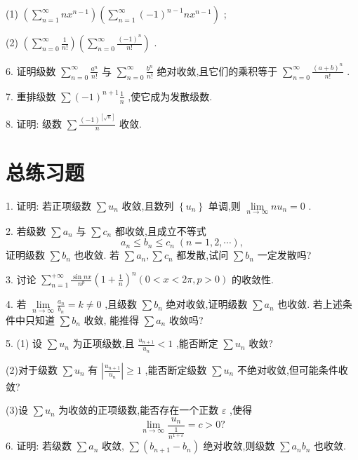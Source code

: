 (1) \(\left( {\mathop{\sum }\limits_{{n = 1}}^{\infty }n{x}^{n - 1}}\right) \left( {\mathop{\sum }\limits_{{n = 1}}^{\infty }{\left( -1\right) }^{n - 1}n{x}^{n - 1}}\right)\) ;

(2) \(\left( {\mathop{\sum }\limits_{{n = 0}}^{\infty }\frac{1}{n!}}\right) \left( {\mathop{\sum }\limits_{{n = 0}}^{\infty }\frac{{\left( -1\right) }^{n}}{n!}}\right)\) .

6. 证明级数 \(\mathop{\sum }\limits_{{n = 0}}^{\infty }\frac{{a}^{n}}{n!}\) 与 \(\mathop{\sum }\limits_{{n = 0}}^{\infty }\frac{{b}^{n}}{n!}\) 绝对收敛,且它们的乘积等于 \(\mathop{\sum }\limits_{{n = 0}}^{\infty }\frac{{\left( a + b\right) }^{n}}{n!}\) .

7. 重排级数 \(\sum {\left( -1\right) }^{n + 1}\frac{1}{n}\) ,使它成为发散级数.

8. 证明: 级数 \(\sum \frac{{\left( -1\right) }^{\left\lbrack  \sqrt{n}\right\rbrack  }}{n}\) 收敛.

\section{总练习题}

1. 证明: 若正项级数 \(\sum {u}_{n}\) 收敛,且数列 \(\left\{  {u}_{n}\right\}\) 单调,则 \(\mathop{\lim }\limits_{{n \rightarrow  \infty }}n{u}_{n} = 0\) .

2. 若级数 \(\sum {a}_{n}\) 与 \(\sum {c}_{n}\) 都收敛,且成立不等式
\[
{a}_{n} \leq  {b}_{n} \leq  {c}_{n}\;\left( {n = 1,2,\cdots }\right) ,
\]
证明级数 \(\sum {b}_{n}\) 也收敛. 若 \(\sum {a}_{n},\sum {c}_{n}\) 都发散,试问 \(\sum {b}_{n}\) 一定发散吗?

3. 讨论 \(\mathop{\sum }\limits_{{n = 1}}^{{+\infty }}\frac{\sin {nx}}{{n}^{p}}{\left( 1 + \frac{1}{n}\right) }^{n}\left( {0 < x < {2\pi },p > 0}\right)\) 的收敛性.

4. 若 \(\mathop{\lim }\limits_{{n \rightarrow  \infty }}\frac{{a}_{n}}{{b}_{n}} = k \neq  0\) ,且级数 \(\sum {b}_{n}\) 绝对收敛,证明级数 \(\sum {a}_{n}\) 也收敛. 若上述条件中只知道 \(\sum {b}_{n}\) 收敛, 能推得 \(\sum {a}_{n}\) 收敛吗?

5. (1) 设 \(\sum {u}_{n}\) 为正项级数,且 \(\frac{{u}_{n + 1}}{{u}_{n}} < 1\) ,能否断定 \(\sum {u}_{n}\) 收敛?

(2)对于级数 \(\sum {u}_{n}\) 有 \(\left| \frac{{u}_{n + 1}}{{u}_{n}}\right|  \geq  1\) ,能否断定级数 \(\sum {u}_{n}\) 不绝对收敛,但可能条件收敛?

(3)设 \(\sum {u}_{n}\) 为收敛的正项级数,能否存在一个正数 \(\varepsilon\) ,使得
\[
\mathop{\lim }\limits_{{n \rightarrow  \infty }}\frac{{u}_{n}}{\frac{1}{{n}^{1 + \varepsilon }}} = c > 0?
\]
6. 证明: 若级数 \(\sum {a}_{n}\) 收敛, \(\sum \left( {{b}_{n + 1} - {b}_{n}}\right)\) 绝对收敛,则级数 \(\sum {a}_{n}{b}_{n}\) 也收敛.

